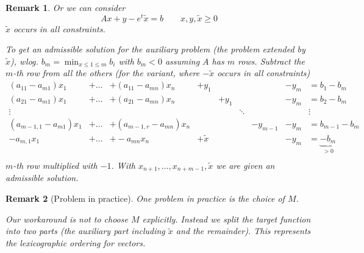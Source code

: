 \documentclass{article}
\numberwithin{lecref}{section}
\newtheorem*{Remark}{Remark}
\begin{document}
\begin{Remark}
	Or we can consider 
	\[ Ax + y - e^t \tilde x = b \qquad x, y, \tilde x \geq 0 \]
	$\tilde x$ occurs in all constraints.

	To get an admissible solution for the auxiliary problem (the problem extended by $\tilde x$), wlog. $b_m = \min_{x \leq 1 \leq m} b_i$ with $b_m < 0$ assuming $A$ has $m$ rows.
	Subtract the $m$-th row from all the others (for the variant, where $-\tilde x$ occurs in all constraints)
	\begin{align}
		\label{mat}
		(a_{11} - a_{m1}) x_1 &+ \dots &+ (a_{11} - a_{mn}) x_n &+ y_1  &       &        &          & -y_m &= b_1 - b_m \\
		(a_{21} - a_{m1}) x_1 &+ \dots &+ (a_{21} - a_{mn}) x_n &       &+ y_1  &        &          & -y_m &= b_2 - b_m \nonumber\\
		\vdots                &        &                        &       &       & \ddots &          &      &\vdots \nonumber\\
		(a_{m-1,1} - a_{m1}) x_1 &+ \dots &+ (a_{m-1,r} - a_{mn}) x_n & &       &        & -y_{m-1} & -y_m &= b_{m-1} - b_m \nonumber\\
		-a_{m,1} x_1 &+ \dots &+ -a_{mn} x_n & + \tilde x &       &        &  & -y_m &= \underbrace{-b_{m}}_{>0} \nonumber\\
	\end{align}
	$m$-th row multiplied with $-1$.
	With $x_{n+1}, \dots, x_{n+m-1}, \tilde x$ we are given an admissible solution.
\end{Remark}

\begin{Remark}[Problem in practice]
	One problem in practice is the choice of $M$.

	Our workaround is not to choose $M$ explicitly. Instead we split the target function into two parts (the auxiliary part including $\tilde x$ and the remainder).
	This represents the lexicographic ordering for vectors.
\end{Remark}
\end{document}
